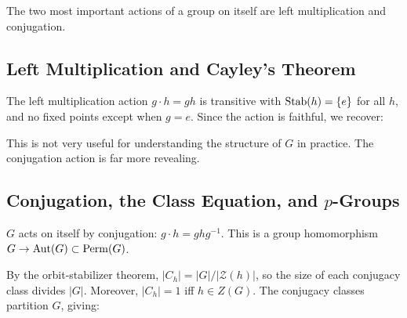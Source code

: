 \documentclass{report}
\begin{document}
The two most important actions of a group on itself are left multiplication and conjugation.

\subsection{Left Multiplication and Cayley's Theorem}

The left multiplication action \(g \cdot h = gh\) is transitive with \(\operatorname{Stab}(h) = \{e\}\) for all \(h\), and no fixed points except when \(g = e\). Since the action is faithful, we recover:


This is not very useful for understanding the structure of \(G\) in practice. The conjugation action is far more revealing.

\subsection{Conjugation, the Class Equation, and \(p\)-Groups}

\(G\) acts on itself by conjugation: \(g \cdot h = ghg^{-1}\). This is a group homomorphism \(G \to \operatorname{Aut}(G) \subset \operatorname{Perm}(G)\).



By the orbit-stabilizer theorem, \(|C_h| = |G| / |\mathcal{Z}(h)|\), so the size of each conjugacy class divides \(|G|\). Moreover, \(|C_h| = 1\) iff \(h \in Z(G)\). The conjugacy classes partition \(G\), giving:

\end{document}
